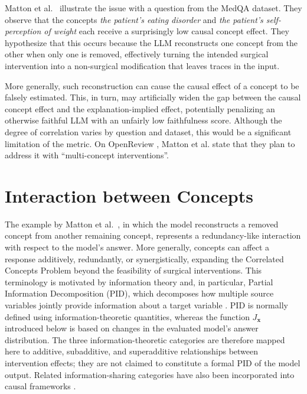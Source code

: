Matton et al.~\cite{mattonWalkTalkMeasuring2024} illustrate the issue with a question from the MedQA dataset. They observe that the concepts \textit{the patient’s eating disorder} and \textit{the patient’s self-perception of weight} each receive a surprisingly low causal concept effect. They hypothesize that this occurs because the LLM reconstructs one concept from the other when only one is removed, effectively turning the intended surgical intervention into a non-surgical modification that leaves traces in the input.

More generally, such reconstruction can cause the causal effect of a concept to be falsely estimated. This, in turn, may artificially widen the gap between the causal concept effect and the explanation-implied effect, potentially penalizing an otherwise faithful LLM with an unfairly low faithfulness score. Although the degree of correlation varies by question and dataset, this would be a significant limitation of the metric. On OpenReview \cite{matton2025walkthetalk_comment}, Matton et al. state that they plan to address it with \enquote{multi-concept interventions}.

\section{Interaction between Concepts}
\label{sec:interaction_effects}
The example by Matton et al.~\cite{mattonWalkTalkMeasuring2024}, in which the model reconstructs a removed concept from another remaining concept, represents a redundancy-like interaction with respect to the model's answer. More generally, concepts can affect a response additively, redundantly, or synergistically, expanding the Correlated Concepts Problem beyond the feasibility of surgical interventions. This terminology is motivated by information theory and, in particular, Partial Information Decomposition (PID), which decomposes how multiple source variables jointly provide information about a target variable \cite{williamsNonnegativeDecompositionMultivariate2010, kolchinskyNovelApproachPartial2022}. PID is normally defined using information-theoretic quantities, whereas the function $J_{\mathbf{x}}$ introduced below is based on changes in the evaluated model's answer distribution. The three information-theoretic categories are therefore mapped here to additive, subadditive, and superadditive relationships between intervention effects; they are not claimed to constitute a formal PID of the model output. Related information-sharing categories have also been incorporated into causal frameworks \cite{martinez-sanchezDecomposingCausalityIts2024}.

